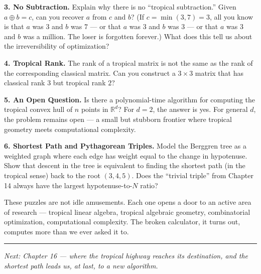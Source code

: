 \textbf{3. No Subtraction.} Explain why there is no ``tropical subtraction.'' Given \(a \oplus b = c\), can you recover \(a\) from \(c\) and \(b\)? (If \(c = \min(3, 7) = 3\), all you know is that \(a\) was \(3\) and \(b\) was \(7\) --- or that \(a\) was \(3\) and \(b\) was \(3\) --- or that \(a\) was \(3\) and \(b\) was a million. The loser is forgotten forever.) What does this tell us about the irreversibility of optimization?

\textbf{4. Tropical Rank.} The rank of a tropical matrix is not the same as the rank of the corresponding classical matrix. Can you construct a \(3 \times 3\) matrix that has classical rank \(3\) but tropical rank \(2\)?

\textbf{5. An Open Question.} Is there a polynomial-time algorithm for computing the tropical convex hull of \(n\) points in \(\mathbb{R}^d\)? For \(d = 2\), the answer is yes. For general \(d\), the problem remains open --- a small but stubborn frontier where tropical geometry meets computational complexity.

\textbf{6. Shortest Path and Pythagorean Triples.} Model the Berggren tree as a weighted graph where each edge has weight equal to the change in hypotenuse. Show that descent in the tree is equivalent to finding the shortest path (in the tropical sense) back to the root \((3, 4, 5)\). Does the ``trivial triple'' from Chapter 14 always have the largest hypotenuse-to-\(N\) ratio?

These puzzles are not idle amusements. Each one opens a door to an active area of research --- tropical linear algebra, tropical algebraic geometry, combinatorial optimization, computational complexity. The broken calculator, it turns out, computes more than we ever asked it to.

\bigskip\noindent\rule{\linewidth}{0.4pt}\bigskip

\emph{Next: Chapter 16 --- where the tropical highway reaches its destination, and the shortest path leads us, at last, to a new algorithm.}
